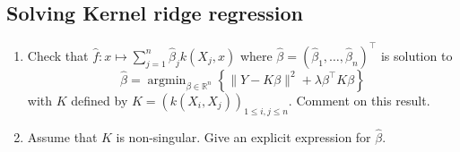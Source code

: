 \documentclass[a4paper,10pt,fleqn]{article}
\newcommand{\R}{\ensuremath{\mathbb{R}}}
\newcommand{\1}{\ensuremath{\mathbbm{1}}}
\newcommand{\argmin}{\mathop{\textrm{argmin}}}
\begin{document}
\subsection{Solving Kernel ridge regression}
\begin{enumerate}
	\item Check that $\widehat f:x\mapsto \sum_{j=1}^n\widehat \beta_{j}k(X_{j},x)$ where $\widehat \beta=(\widehat \beta_{1},\ldots,\widehat \beta_{n})^\top$ is solution to
	$$ \widehat \beta=\argmin_{\beta\in\R^n}\left\{\|Y-K\beta\|^2+{\lambda} \beta^\top K\beta\right\}$$
	with $K$ defined by $K=(k(X_{i},X_{j}))_{1\leq i,j\leq n}$. Comment on this result.

%
	\item Assume that $K$ is non-singular. Give an explicit expression for $\widehat \beta$.

%
\end{enumerate}
\end{document}
